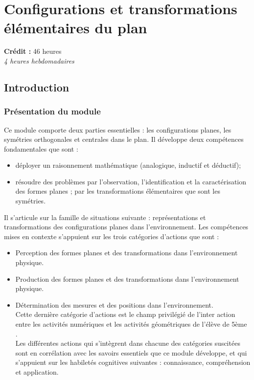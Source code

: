 \chapter{Configurations et transformations élémentaires du plan}

{\AlegreyaSansLight \large
\begin{center}
\textbf{Crédit :} 46 heures\\
\textit{4 heures hebdomadaires}
\end{center}
}

\minitoc

\section{Introduction}

\subsection{Présentation du module}
Ce module comporte deux parties essentielles : les configurations planes, les symétries orthogonales et centrales dans le plan. Il développe deux compétences fondamentales que sont :
\begin{itemize}
\item déployer un raisonnement mathématique (analogique, inductif et déductif);
\item résoudre des problèmes par l'observation, l'identification et la caractérisation des formes planes ; par les transformations élémentaires que sont les symétries.
\end{itemize}
Il s'articule sur la famille de situations suivante : représentations et transformations des configurations planes dans l'environnement. Les compétences mises en contexte s'appuient sur les trois catégories d'actions que sont :
\begin{itemize}
\item Perception des formes planes et des transformations dans l'environnement physique.
\item Production des formes planes et des transformations dans l'environnement physique.
\item Détermination des mesures et des positions dans l'environnement.\\
Cette dernière catégorie d'actions est le champ privilégié de l'inter action entre les activités numériques et les activités géométriques de l’élève de 5ème .\\
Les différentes actions qui s'intègrent dans chacune des catégories suscitées sont en corrélation avec les savoirs essentiels que ce module développe, et qui s'appuient sur les habiletés cognitives suivantes : connaissance, compréhension et application.
\end{itemize}

